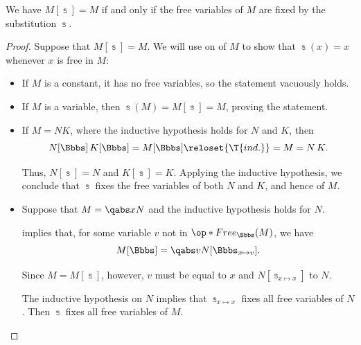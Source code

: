 \begin{proposition}\label{thm:lambda_substitution_noop}
  We have \( M[\Bbbs] = M \) if and only if the free variables of \( M \) are fixed by the substitution \( \Bbbs \).
\end{proposition}
\begin{proof}
  \SufficiencySubProof Suppose that \( M[\Bbbs] = M \). We will use  on of \( M \) to show that \( \Bbbs(x) = x \) whenever \( x \) is free in \( M \):
  \begin{itemize}
    \item If \( M \) is a constant, it has no free variables, so the statement vacuously holds.
    \item If \( M \) is a variable, then \( \Bbbs(M) = M[\Bbbs] = M \), proving the statement.
    \item If \( M = NK \), where the inductive hypothesis holds for \( N \) and \( K \), then
    \begin{equation*}
      N[\Bbbs] \thinspace K[\Bbbs]
      =
      M[\Bbbs]
      \reloset {\T{ind.}} =
      M
      =
      N \thinspace K.
    \end{equation*}

    Thus, \( N[\Bbbs] = N \) and \( K[\Bbbs] = K \). Applying the inductive hypothesis, we conclude that \( \Bbbs \) fixes the free variables of both \( N \) and \( K \), and hence of \( M \).

    \item Suppose that \( M = \qabs x N \) and the inductive hypothesis holds for \( N \).

     implies that, for some variable \( v \) not in \( \op*{Free}_\Bbbs(M) \), we have
    \begin{equation*}
      M[\Bbbs] = \qabs v N[\Bbbs_{x \mapsto v}].
    \end{equation*}

    Since \( M = M[\Bbbs] \), however, \( v \) must be equal to \( x \) and \( N[\Bbbs_{x \mapsto x}] \) to \( N \).

    The inductive hypothesis on \( N \) implies that \( \Bbbs_{x \mapsto x} \) fixes all free variables of \( N \). Then \( \Bbbs \) fixes all free variables of \( M \).
  \end{itemize}


\end{proof}
